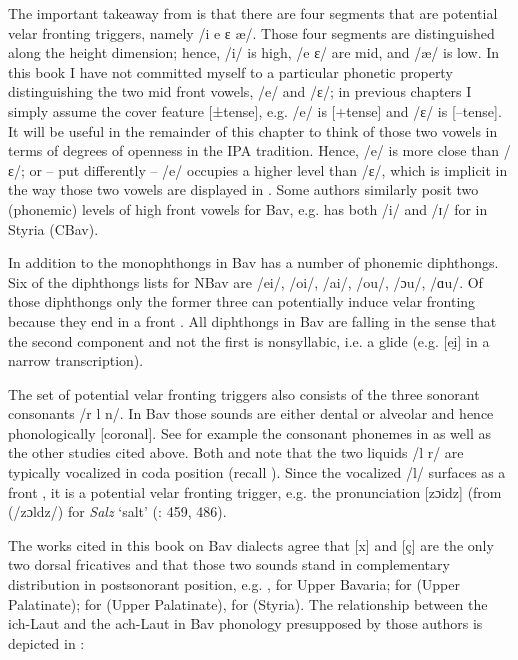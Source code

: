 The important takeaway from  is that there are four segments that are potential velar fronting triggers, namely /i e ɛ æ/. Those four segments are distinguished along the height dimension; hence, /i/ is high, /e ɛ/ are mid, and /æ/ is low. In this book I have not committed myself to a particular phonetic property distinguishing the two mid front vowels, /e/ and /ɛ/; in previous chapters I simply assume the cover feature [±tense], e.g. /e/ is [+tense] and /ɛ/ is [--tense]. It will be useful in the remainder of this chapter to think of those two vowels in terms of degrees of openness in the IPA tradition. Hence, /e/ is more close than /ɛ/; or -- put differently -- /e/ occupies a higher level than /ɛ/, which is implicit in the way those two vowels are displayed in . Some authors similarly posit two (phonemic) levels of high front vowels for Bav, e.g. \citet{Noelliste2017} has both /i/ and /ɪ/ for  in Styria (CBav).

In addition to the monophthongs in  Bav has a number of phonemic diphthongs. Six of the diphthongs \citet{Rowley1989} lists for NBav are /ei/, /oi/, /ai/, /ou/, /ɔu/, /ɑu/. Of those diphthongs only the former three can potentially induce velar fronting because they end in a front . All diphthongs in Bav are falling in the sense that the second component and not the first is nonsyllabic, i.e. a glide (e.g. [ei̯] in a narrow transcription).

The set of potential velar fronting triggers also consists of the three sonorant consonants /r l n/. In Bav those sounds are either dental or alveolar and hence phonologically [coronal]. See for example the consonant phonemes in \citet[423]{Rowley1989} as well as the other studies cited above. Both \citet{Rowley1989} and \citet{Wiesinger1989} note that the two liquids /l r/ are typically vocalized in coda position (recall ). Since the vocalized /l/ surfaces as a front , it is a potential velar fronting trigger, e.g. the pronunciation [zɔidz] (from (/zɔldz/) for \textit{Salz} ‘salt’ (\citealt{Wiesinger1989}: 459, 486).

The works cited in this book on Bav dialects agree that [x] and [ç] are the only two dorsal fricatives and that those two sounds stand in complementary distribution in postsonorant position, e.g. \citet[71]{Kranzmayer1956}, \citet[12--13]{Kufner1960} for Upper Bavaria; \citet[81–83; 103–104]{Dozauer1967} for  (Upper Palatinate); \citet[43]{Bachmann2000} for  (Upper Palatinate), \citet{Noelliste2017} for  (Styria). The relationship between the ich-Laut and the ach-Laut in Bav phonology presupposed by those authors is depicted in :

